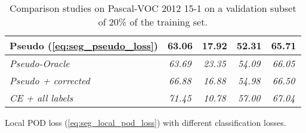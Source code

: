 \begin{table}
\begin{subtable}{\textwidth}
\begin{tabular}{@{}l|cccc@{}}
            Pseudo (\autoref{eq:seg_pseudo_loss}) & \textbf{63.06} & \textbf{17.92}    & \textbf{52.31} & \textbf{65.71} \\
            \midrule
            \textit{\small{Pseudo-Oracle}}        & \textit{63.69} & \textit{23.35}    & \textit{54.09} & \textit{66.05} \\
            \textit{\small{Pseudo + corrected}}   & \textit{66.88} & \textit{16.88}    & \textit{54.98} & \textit{66.50} \\
            \textit{\small{CE + all labels}}      & \textit{71.45} & \textit{10.78}    & \textit{57.00} & \textit{67.04} \\
            \bottomrule
        \end{tabular}
        \caption{Local POD loss (\autoref{eq:seg_local_pod_loss}) with different classification losses.}
        \label{tab:seg_ablation_classif}
    \end{subtable}
    \caption{Comparison studies on Pascal-VOC 2012 15-1 on a validation subset of 20\% of the training set.}
    \label{tab:seg_ablation_distill_classif}
\end{table}



